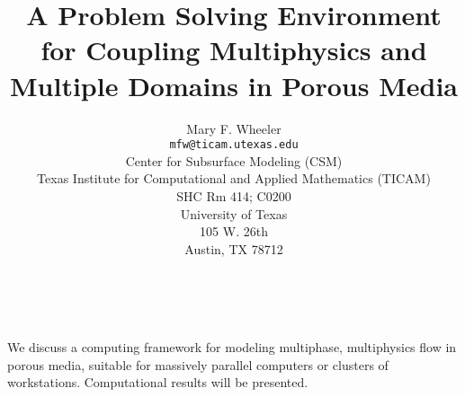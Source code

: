 \documentclass[11pt]{article}
\date{ ~ \hspace{-4mm}}
\title{A Problem Solving Environment for Coupling Multiphysics and Multiple Domains in Porous Media  }
\author{Mary F. Wheeler \\ {\tt  mfw@ticam.utexas.edu} \\ Center for Subsurface Modeling (CSM)  \\  Texas Institute for Computational and Applied Mathematics (TICAM)  \\  SHC Rm 414; C0200  \\  University of Texas  \\  105 W. 26th  \\  Austin, TX 78712}
\begin{document}
\maketitle
\thispagestyle{empty}





 



We discuss a computing framework for modeling multiphase, multiphysics
flow in porous media, suitable for massively parallel computers or
clusters of workstations.  Computational results will be presented.
\end{document}
